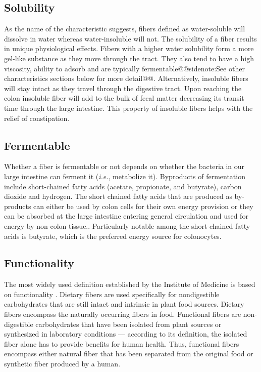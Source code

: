 \documentclass{tufte-handout}
\makeatletter
\def\sidenote#1{@@sidenote:#1@@}
\makeatother
\begin{document}
\subsection{Solubility}
As the name of the characteristic suggests, fibers defined as water-soluble will dissolve in water whereas water-insoluble will not. The solubility of a fiber results in unique physiological effects. Fibers with a higher water solubility form a more gel-like substance as they move through the tract. They also tend to have a high viscosity, ability to adsorb and are typically fermentable\sidenote{See other characteristics sections below for more detail}. Alternatively, insoluble fibers will stay intact as they travel through the digestive tract. Upon reaching the colon insoluble fiber will add to the bulk of fecal matter decreasing its transit time through the large intestine. This property of insoluble fibers helps with the relief of constipation.

\subsection{Fermentable}
Whether a fiber is fermentable or not depends on whether the bacteria in our large intestine can ferment it (\textit{i.e.}, metabolize it). Byproducts of fermentation include short-chained fatty acids (acetate, propionate, and butyrate), carbon dioxide and hydrogen. The short chained fatty acids that are produced as by-products can either be used by colon cells for their own energy provision or they can be absorbed at the large intestine entering general circulation and used for energy by non-colon tissue.. Particularly notable among the short-chained fatty acids is butyrate, which is the preferred energy source for colonocytes. 

\subsection{Functionality}
The most widely used definition established by the Institute of Medicine is based on functionality \citep{InstituteofMedicine2005}. Dietary fibers are used specifically for nondigestible carbohydrates that are still intact and intrinsic in plant food sources. Dietary fibers encompass the naturally occurring fibers in food. Functional fibers are non-digestible carbohydrates that have been isolated from plant sources or synthesized in laboratory conditions --- according to its definition, the isolated fiber alone has to provide benefits for human health. Thus, functional fibers encompass either natural fiber that has been separated from the original food or synthetic fiber produced by a human.
\end{document}
